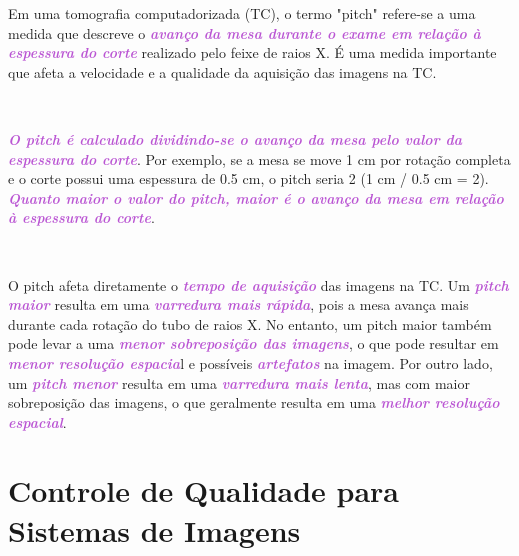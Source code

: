 \documentclass[11pt,a4paper]{article}
\newcounter{exemplo}
\begin{document}
    \begin{tcolorbox}[width=\textwidth, colback={white}, colbacktitle={DarkTurquoise!50!white}, title={$\bigstar$ \LobsterTwo{Pitch} $\bigstar $}, coltitle={CarnationPink}, colframe={DarkTurquoise}, fonttitle=\rmfamily\bfseries\Large]
        Em uma tomografia computadorizada (TC), o termo "pitch" refere-se a uma medida que descreve o \textcolor{MediumOrchid}{\textbf{\textit{avanço da mesa durante o exame em relação à espessura do corte}}} realizado pelo feixe de raios X. É uma medida importante que afeta a velocidade e a qualidade da aquisição das imagens na TC.

        \

        \textcolor{MediumOrchid}{\textbf{\textit{O pitch é calculado dividindo-se o avanço da mesa pelo valor da espessura do corte}}}. Por exemplo, se a mesa se move 1 cm por rotação completa e o corte possui uma espessura de 0.5 cm, o pitch seria 2 (1 cm / 0.5 cm = 2). \textcolor{MediumOrchid}{\textbf{\textit{Quanto maior o valor do pitch, maior é o avanço da mesa em relação à espessura do corte}}}.

        \

        O pitch afeta diretamente o \textcolor{MediumOrchid}{\textbf{\textit{tempo de aquisição}}} das imagens na TC. Um \textcolor{MediumOrchid}{\textbf{\textit{pitch maior}}} resulta em uma \textcolor{MediumOrchid}{\textbf{\textit{varredura mais rápida}}}, pois a mesa avança mais durante cada rotação do tubo de raios X. No entanto, um pitch maior também pode levar a uma \textcolor{MediumOrchid}{\textbf{\textit{menor sobreposição das imagens}}}, o que pode resultar em \textcolor{MediumOrchid}{\textbf{\textit{menor resolução espacia}}}l e possíveis \textcolor{MediumOrchid}{\textbf{\textit{artefatos}}} na imagem. Por outro lado, um \textcolor{MediumOrchid}{\textbf{\textit{pitch menor}}} resulta em uma \textcolor{MediumOrchid}{\textbf{\textit{varredura mais lenta}}}, mas com maior sobreposição das imagens, o que geralmente resulta em uma \textcolor{MediumOrchid}{\textbf{\textit{melhor resolução espacial}}}.
    \end{tcolorbox}

\section{Controle de Qualidade para Sistemas de Imagens}
\end{document}
